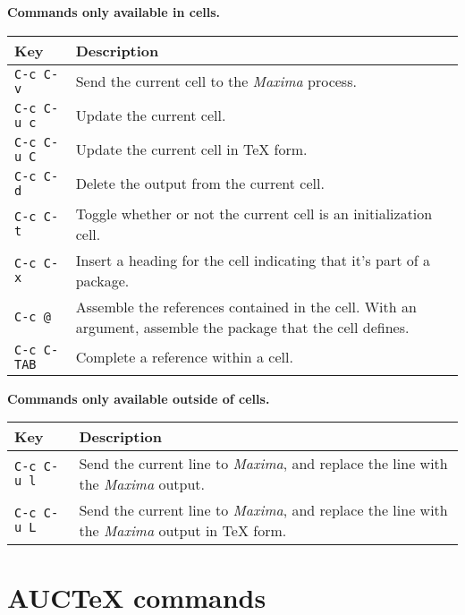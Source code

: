 \documentclass{article}
\newcommand{\mx}{\textsl{\sffamily Maxima}}
\begin{document}
\smallskip

\noindent
\textbf{Commands only available in cells.}

\smallskip

\noindent
\begin{tabular}{p{\firstcol}p{\secondcol}}
\hline
\textbf{Key} & \textbf{Description}\\
\hline
\texttt{C-c C-v}
& Send the current cell to the \mx{} process.\\
\texttt{C-c C-u c}
& Update the current cell.\\
\texttt{C-c C-u C}
& Update the current cell in \TeX{} form.\\
\texttt{C-c C-d}
& Delete the output from the current cell.\\
\texttt{C-c C-t}
& Toggle whether or not the current cell is an initialization cell.\\
\texttt{C-c C-x}
& Insert a heading for the cell indicating that it's part of a
package. \\
\texttt{C-c @}
& Assemble the references contained in the cell.  With an argument,
assemble the package that the cell defines.\\
\texttt{C-c C-\texttt{TAB}}
& Complete a reference within a cell.
\end{tabular}

\smallskip

\noindent
\textbf{Commands only available outside of cells.}

\smallskip

\noindent
\begin{tabular}{p{\firstcol}p{\secondcol}}
\hline
\textbf{Key} & \textbf{Description}\\
\hline
\texttt{C-c C-u l}
& Send the current line to \mx{}, and replace the line with the
\mx{} output.\\
\texttt{C-c C-u L}
& Send the current line to \mx{}, and replace the line with the
\mx{} output in \TeX{} form.
\end{tabular}

\newpage

\section{AUC\TeX{} commands}
\end{document}
